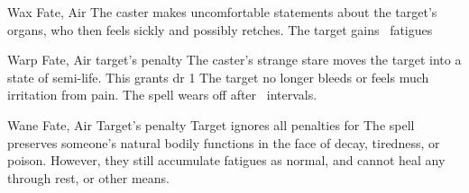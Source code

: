 \ifodd\value{diceNo}
  {}%
  {Wax}%
  {Fate, Air}%
  {}%
  {The caster makes uncomfortable statements about the target's organs, who then feels sickly and possibly retches.
  The target gains ~\glspl{fatigue}}%
  {}

\else

  {}%
  {Warp}%
  {Fate, Air}%
  {target's  penalty}%
  {The caster's strange stare moves the target into a state of semi-life.
  This grants \gls{dr} 1}%
  {
    The target no longer bleeds or feels much irritation from pain.%
    The spell wears off after ~\glspl{interval}.}

  {}%
  {Wane}%
  {Fate, Air}%
  {Target's  penalty}%
  {Target ignores all  penalties for }%
  {The spell preserves someone's natural bodily functions in the face of decay, tiredness, or poison.
    However, they still accumulate \glspl{fatigue} as normal, and cannot heal any through rest, or other means.}

\fi
{}
